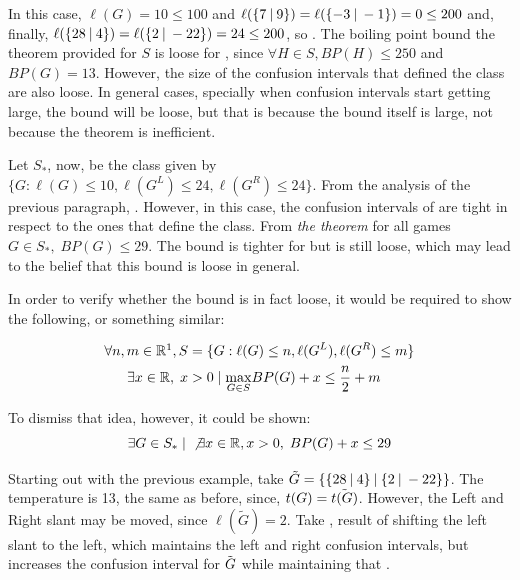 In this case, $\ell(G) = 10 \leq 100$ and \mbox{$\ell(\mbox{$\{7\:|\:9\}$}) = \ell(\mbox{$\{-3\:|\:-1\}$}) = 0 \leq 200$} and, finally, \mbox{$\ell(\mbox{$\{28\:|\:4\}$}) = \ell(\mbox{$\{2\:|\:-22\}$}) = 24 \leq 200$}, so . The boiling point bound the theorem provided for $S$ is loose for \Gm{}, since $\forall H \in S, BP(H) \leq 250$ and $BP(G) = 13$. However, the size of the confusion intervals that defined the class are also loose. In general cases, specially when confusion intervals start getting large, the bound will be loose, but that is because the bound itself is large, not because the theorem is inefficient.

Let $S_*$, now, be the class given by $\{G : \ell(G)\leq10, \ell(G^L)\leq24, \ell(G^R)\leq24\}$. From the analysis of the previous paragraph, . However, in this case, the confusion intervals of \Gm{} are tight in respect to the ones that define the class. From \textit{the theorem} for all games $G \in S_*,\; BP(G) \leq 29$. The bound is tighter for \Gm{} but is still loose, which may lead to the belief that this bound is loose in general.

In order to verify whether the bound is in fact loose, it would be required to show the following, or something similar:

\begin{align*}
\forall n, m \in \mathbb{R}\footnotemark, S &= \{G : \ell(G) \leq n, \ell(G^L),\ell(G^R) \leq m\} \\
\exists x\in \mathbb{R},\; x &> 0\;|\; \underset{G\in S}{\max}BP(G) + x \leq \frac{n}{2} + m
\end{align*}


To dismiss that idea, however, it could be shown:
$$
\exists G \in S_*\;|\;\not\exists x \in \mathbb{R}, x>0,\; BP(G) + x \leq 29
$$

Starting out with the previous example, take $\tilde{G} = \mbox{$\{\mbox{$\{28\:|\:4\}$}\:|\:\mbox{$\{2\:|\:-22\}$}\}$}$. The temperature is 13, the same as before, since, $t(\mbox{$G$}) = \tilde{t(\mbox{$G$})}$. However, the Left and Right slant may be moved, since $\ell(\tilde{G}) = 2$. Take , result of shifting the left slant to the left, which maintains the left and right confusion intervals, but increases the confusion interval for $\tilde{\mbox{$G$}}$ while maintaining that .

